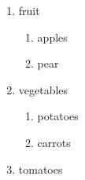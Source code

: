 \documentclass[a4paper]{article}
\begin{document}


    \begin{enumerate}[EX I.]
        \item fruit
            \begin{enumerate}[{example} a)]
                \item apples\cite{MyId}
                \item[\fbox{!!!}] pear
            \end{enumerate}
        \item vegetables
            \begin{enumerate}
                \item potatoes
                \item carrots
            \end{enumerate}
        \item tomatoes
    \end{enumerate}

    \pagebreak

    
    \renewcommand{\notesname}{The name of the notes XD}
    \theendnotes

    
\end{document}
